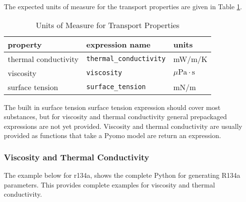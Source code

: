 \documentclass[oneside]{book}
\begin{document}
The expected units of measure for the transport properties are given in Table \ref{table:transport_units}.

\begin{table}[h!]
\centering
\caption{Units of Measure for Transport Properties}
\begin{tabular}{ l l l }
\hline
property & expression name & units  \\
\hline
\hline
 thermal conductivity &  \texttt{thermal\_conductivity} & mW/m/K  \\  
 viscosity & \texttt{viscosity} & $ \mu \text{Pa} \cdot \text{s} $  \\
 surface tension & \texttt{surface\_tension} &  mN/m   \\
 \hline    
\end{tabular}
\label{table:transport_units}
\end{table}

The built in surface tension surface tension expression should cover most substances, but for viscosity and thermal conductivity general prepackaged expressions are not yet provided.  Viscosity and thermal conductivity are usually provided as functions that take a Pyomo model are return an expression.



\subsubsection{Viscosity and Thermal Conductivity}

The example below for r134a, shows the complete Python for generating R134a parameters.  This provides complete examples for viscosity and thermal conductivity.
\end{document}
